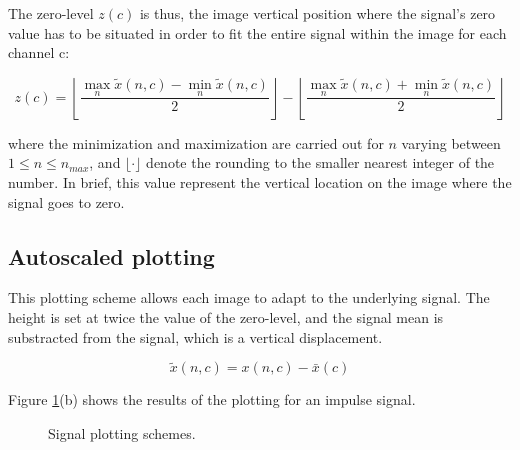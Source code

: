 The zero-level $z(c)$ is thus, the image vertical position where the signal's zero value has to be situated in order to fit the entire signal within the image for each channel c:

\begin{equation}
z(c) = \left \lfloor{ \frac{\max_{n} \tilde{x}(n,c)  - \min_{n} \tilde{x}(n,c) }{2} }\right \rfloor -   \left \lfloor{ \frac{\max_{n} \tilde{x}(n,c)  + \min_{n} \tilde{x}(n,c)}{ 2} }\right \rfloor
\label{eq:zerolevel}
\end{equation}

\noindent where the minimization and maximization are carried out for $n$ varying between ${1 \leq n\leq n_{max}}$, and $ \lfloor \cdot  \rfloor $ denote the rounding to the smaller nearest integer of the number.  In brief, this value represent the vertical location on the image where the signal goes to zero.


\subsection{Autoscaled plotting}

This plotting scheme allows each image to adapt to the underlying signal.  The height is set at twice the value of the zero-level, and the signal mean is substracted from the signal, which is a vertical displacement.

\begin{equation}
\tilde{x}(n,c) =  x(n,c) - \bar{x}(c) 
\label{eq:standarizedaverages}
\end{equation}

Figure \ref{fig:plottingscheme}(b) shows the results of the plotting for an impulse signal.

\begin{figure}[htb]
\centering
{}
\caption[Signal plot of an impulse response]{Signal plotting schemes.}
\label{fig:plottingscheme}
\end{figure}

